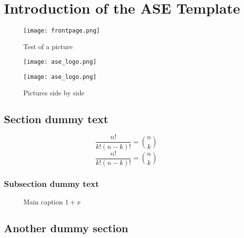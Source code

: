 \chapter{Introduction of the ASE Template}
\label{chap:f}
\setcounter{page}{1}
\lipsum[1]

\begin{figure}[htp]
  \centering
  \texttt{[image: frontpage.png]}
  \caption{Test of a picture}
  \label{fig:test}
\end{figure}

\lipsum[1]
\begin{figure}[ht]
  \begin{minipage}[htp]{0.48\linewidth}
    \centering
    \texttt{[image: ase\_logo.png]}
  \end{minipage}
  \hfill
  \begin{minipage}[htp]{0.48\linewidth}
    \centering
      \texttt{[image: ase\_logo.png]}
  \end{minipage}
    \caption{Pictures side by side}
  \label{fig:test1}
\end{figure}

\lipsum[1]

\section{Section dummy text}

\lipsum[1]

\[
 \frac{n!}{k!(n-k)!} = \binom{n}{k}
\]
\begin{equation}
  \frac{n!}{k!(n-k)!} = \binom{n}{k}
\end{equation}
\lipsum[1]

\subsection{Subsection dummy text}

\lipsum[1]

\begin{figure}
     \hfill
    \caption{Main caption $1+x$} 
\end{figure}

\lipsum[1]
\section{Another dummy section}

\lipsum